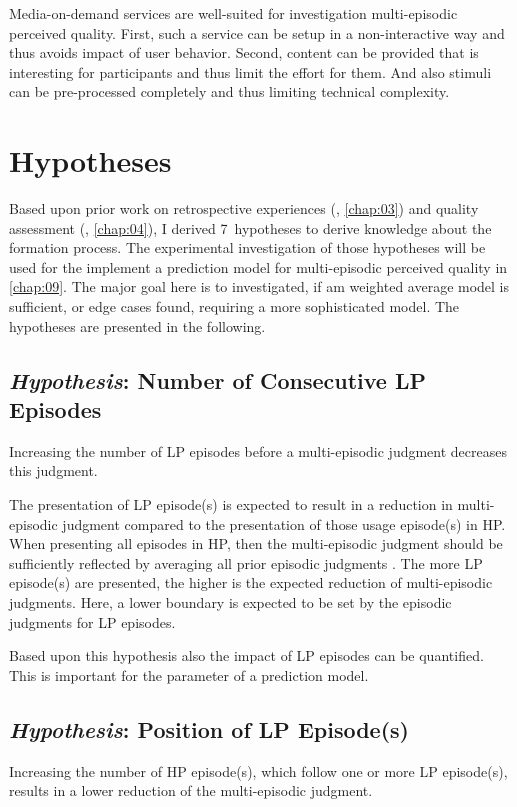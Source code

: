 Media-on-demand services are well-suited for investigation multi-episodic perceived quality.
First, such a service can be setup in a non-interactive way and thus avoids impact of user behavior.
Second, content can be provided that is interesting for participants and thus limit the effort for them.
And also stimuli can be pre-processed completely and thus limiting technical complexity.

\section{Hypotheses}
Based upon prior work on retrospective experiences (\cf, \autoref{chap:03}) and quality assessment (\cf, \autoref{chap:04}), I derived 7~hypotheses to derive knowledge about the formation process.
The experimental investigation of those hypotheses will be used for the implement a prediction model for multi-episodic perceived quality in \autoref{chap:09}.
The major goal here is to investigated, if am weighted average model is sufficient, or edge cases found, requiring a more sophisticated model.
The hypotheses are presented in the following.

\subsection{\emph{Hypothesis}: Number of Consecutive \acs{LP} Episodes}
\begin{hypothesis}\label{hypo:number}
Increasing the number of \ac{LP} episodes before a multi-episodic judgment decreases this judgment.
\end{hypothesis}

The presentation of \ac{LP} episode(s) is expected to result in a reduction in multi-episodic judgment compared to the presentation of those usage episode(s) in \ac{HP}.
When presenting all episodes in \ac{HP}, then the multi-episodic judgment should be sufficiently reflected by averaging all prior episodic judgments \citep[\cf,][]{moller_single-call_2011}.
The more \ac{LP} episode(s) are presented, the higher is the expected reduction of multi-episodic judgments.
Here, a lower boundary is expected to be set by the episodic judgments for \ac{LP} episodes.

Based upon this hypothesis also the impact of \ac{LP} episodes can be quantified.
This is important for the parameter of a prediction model.


\subsection{\emph{Hypothesis}: Position of \acs{LP} Episode(s)}
\begin{hypothesis}\label{hypo:position}
Increasing the number of \ac{HP} episode(s), which follow one or more \ac{LP} episode(s), results in a lower reduction of the multi-episodic judgment.
\end{hypothesis}

